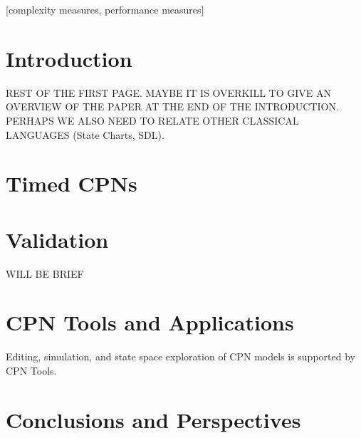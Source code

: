 \documentclass{acm_proc_article-sp}
\begin{document}
\maketitle
\begin{abstract}

Coloured Petri Nets (CPNs) combine Petri nets with a programming
language to obtain a scalable formal modeling language for concurrent
systems. Petri nets provide the formal foundation for modeling
concurrency and synchronization, and a programming language provides
the primitives for modeling data manipulation and creating compact and
parameterizable models. We provide an example driven introduction to
the core syntactical and semantical constructs of the CPN modeling
language, and briefly surveys how quantitative and qualitative
behavioral properties of CPN models can be validated using
simulation-based performance analysis and explicit state space
exploration. In addition, we give a brief overview of CPN Tools which
provide tool support for the practical use of CPNs, and provide
pointers to significant examples the CPN technology has been put into
practical use. As we proceed, we provide a historical perspective on
the research that led to the development of the CPN language.

\end{abstract}

[complexity measures, performance measures]



\section{Introduction}

REST OF THE FIRST PAGE. MAYBE IT IS OVERKILL TO GIVE AN OVERVIEW OF
THE PAPER AT THE END OF THE INTRODUCTION. PERHAPS WE ALSO NEED TO
RELATE OTHER CLASSICAL LANGUAGES (State Charts, SDL).



\section{Timed CPNs}

\section{Validation}

WILL BE BRIEF

\section{CPN Tools and Applications}

Editing, simulation, and state space exploration of CPN models is
supported by CPN Tools.

\section{Conclusions and Perspectives}


\end{document}
